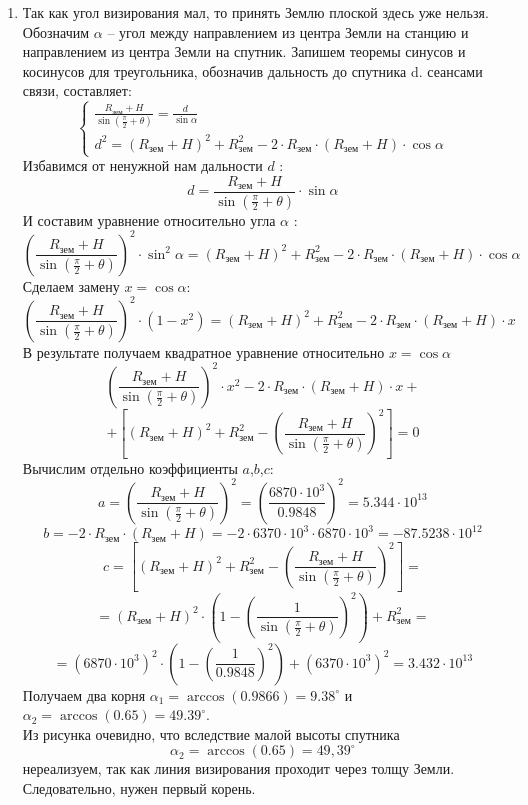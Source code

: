 \begin{enumerate}
    \item Так как угол визирования мал, то принять Землю плоской здесь уже нельзя. Обозначим $\alpha$ – угол между направлением из центра Земли на станцию и направлением из центра Земли на спутник. Запишем теоремы синусов и косинусов для треугольника, обозначив дальность до спутника d. 
    сеансами связи, составляет:
    \begin{equation*}\nonumber
    \begin{cases}
    \frac{R_\text{зем}+H}{\sin\left(\frac{\pi}{2}+\theta\right)}=\frac{d}{\sin\alpha}
    \\
    d^2=(R_\text{зем}+H)^2+R_\text{зем}^2-2\cdot R_\text{зем}\cdot(R_\text{зем}+H)\cdot\cos\alpha
    \end{cases}
    \end{equation*}
    Избавимся от ненужной нам дальности $d$ :
    $$d=\frac{R_\text{зем}+H}{\sin\left(\frac{\pi}{2}+\theta\right)}\cdot\sin\alpha$$
    И составим уравнение относительно угла $\alpha$ :
    $$\left(\frac{R_\text{зем}+H}{\sin\left(\frac{\pi}{2}+\theta\right)}\right)^2\cdot \sin^2\alpha =(R_\text{зем}+H)^2+R_\text{зем}^2-2\cdot R_\text{зем}\cdot(R_\text{зем}+H)\cdot\cos\alpha$$
    Сделаем замену $x=\cos\alpha$:
    $$\left(\frac{R_\text{зем}+H}{\sin\left(\frac{\pi}{2}+\theta\right)}\right)^2\cdot(1-x^2 )=(R_\text{зем}+H)^2+R_\text{зем}^2-2\cdot R_\text{зем}\cdot(R_\text{зем}+H)\cdot x$$
    В результате получаем квадратное уравнение относительно $x=\cos\alpha$
    $$\left(\frac{R_\text{зем}+H}{\sin\left(\frac{\pi}{2}+\theta\right)}\right)^2\cdot x^2-2\cdot R_\text{зем}\cdot(R_\text{зем}+H)\cdot x+$$
    $$+\left[(R_\text{зем}+H)^2+R_\text{зем}^2-\left(\frac{R_\text{зем}+H}{\sin\left(\frac{\pi}{2}+\theta\right)}\right)^2\right]=0$$
    Вычислим отдельно коэффициенты $a$,$b$,$c$:
    $$a=\left(\frac{R_\text{зем}+H}{\sin\left(\frac{\pi}{2}+\theta\right)}\right)^2=\left(\frac{6870\cdot10^3}{0.9848}\right)^2=5.344\cdot10^{13}$$
    $$b=-2\cdot R_\text{зем}\cdot(R_\text{зем}+H)=-2\cdot6370\cdot10^3\cdot6870\cdot10^3=-87.5238\cdot10^{12}$$
    $$c=\left[(R_\text{зем}+H)^2+R_\text{зем}^2-\left(\frac{R_\text{зем}+H}{\sin\left(\frac{\pi}{2}+\theta\right)}\right)^2\right]=$$
    $$=(R_\text{зем}+H)^2\cdot\left(1-\left(\frac{1}{\sin\left(\frac{\pi}{2}+\theta\right)}\right)^2\right)+R_\text{зем}^2=$$
    $$=(6870\cdot10^3 )^2\cdot\left(1-\left(\frac{1}{0.9848}\right)^2\right)+(6370\cdot10^3)^2=3.432\cdot10^{13}$$
    Получаем два корня $\alpha_1=\arccos(0.9866)=9.38^\circ$ и $\alpha_2=\arccos(0.65)=49.39^\circ$. \\
    Из рисунка очевидно, что вследствие малой высоты спутника  $$\alpha_2=\arccos(0.65)=49,39^\circ$$ нереализуем, так как линия визирования проходит через толщу Земли. Следовательно, нужен первый корень.                     
    

\end{enumerate}

